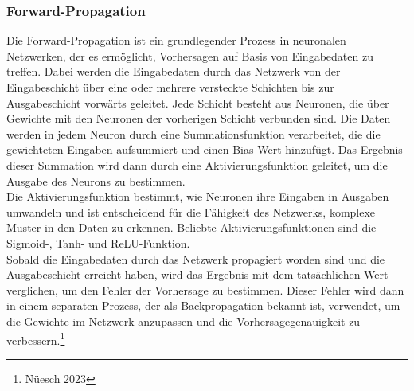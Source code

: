 \subsubsection{ Forward-Propagation}
\label{sec:RealForwardPropagation}
Die Forward-Propagation ist ein grundlegender Prozess in neuronalen Netzwerken, der es ermöglicht, Vorhersagen auf Basis von Eingabedaten zu treffen. Dabei werden die Eingabedaten durch das Netzwerk von der Eingabeschicht über eine oder mehrere versteckte Schichten bis zur Ausgabeschicht vorwärts geleitet. Jede Schicht besteht aus Neuronen, die über Gewichte mit den Neuronen der vorherigen Schicht verbunden sind. Die Daten werden in jedem Neuron durch eine Summationsfunktion verarbeitet, die die gewichteten Eingaben aufsummiert und einen Bias-Wert hinzufügt. Das Ergebnis dieser Summation wird dann durch eine Aktivierungsfunktion geleitet, um die Ausgabe des Neurons zu bestimmen.
\\
Die Aktivierungsfunktion bestimmt, wie Neuronen ihre Eingaben in Ausgaben umwandeln und ist entscheidend für die Fähigkeit des Netzwerks, komplexe Muster in den Daten zu erkennen. Beliebte Aktivierungsfunktionen sind die Sigmoid-, Tanh- und ReLU-Funktion.
\\
Sobald die Eingabedaten durch das Netzwerk propagiert worden sind und die Ausgabeschicht erreicht haben, wird das Ergebnis mit dem tatsächlichen Wert verglichen, um den Fehler der Vorhersage zu bestimmen. Dieser Fehler wird dann in einem separaten Prozess, der als Backpropagation bekannt ist, verwendet, um die Gewichte im Netzwerk anzupassen und die Vorhersagegenauigkeit zu verbessern.\footnote{Nüesch 2023}
